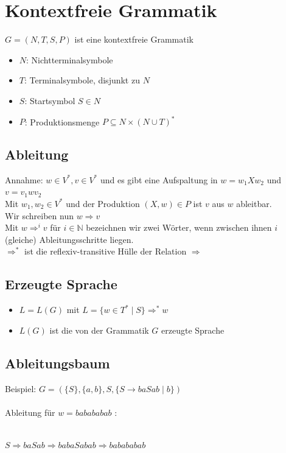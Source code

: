 \documentclass[a4paper,portrait]{scrartcl}
\begin{document}
\section{Kontextfreie Grammatik}
$G=(N,T,S,P)$ ist eine kontextfreie Grammatik \\
\begin{itemize}
\item $N$: Nichtterminalsymbole
\item $T$: Terminalsymbole, disjunkt zu $N$
\item $S$: Startsymbol $S \in N$
\item $P$: Produktionsmenge $P \subseteq N \times (N \cup T)^{*}$
\end{itemize}
\subsection{Ableitung}
Annahme: $w \in V^{*}, v \in V^{*}$ und es gibt eine Aufspaltung in $w=w_{1}Xw_{2}$ und $v=v_{1}wv_{2}$\\
Mit $w_{1}, w_{2} \in V^{*}$ und der Produktion $(X,w) \in P$ ist $v$ aus $w$ ableitbar.\\
 Wir schreiben nun $w \Rightarrow v$ \\
Mit $w \Rightarrow^{i} v$ für $i \in \mathbb{N}$ bezeichnen wir zwei Wörter, wenn zwischen ihnen $i$ (gleiche) Ableitungsschritte liegen. \\
$\Rightarrow^{*}$ ist die reflexiv-transitive Hülle der Relation $\Rightarrow$
\subsection{Erzeugte Sprache}
\begin{itemize}
\item $L=L(G)$ mit $L=\lbrace w \in T^{*} \mid S \rbrace \Rightarrow^{*} w$
\item $L(G)$ ist die von der Grammatik $G$ erzeugte Sprache
\end{itemize}
\subsection{Ableitungsbaum}
Beispiel: $G=( \lbrace S \rbrace , \lbrace a,b \rbrace ,S, \lbrace S \rightarrow baSab \mid b \rbrace )$ \\ \\
Ableitung für $w=babababab$ : \\

 \\
$S \Rightarrow baSab \Rightarrow babaSabab \Rightarrow babababab$
\end{document}
